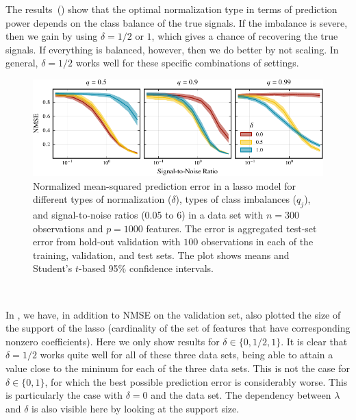 The results~() show that the optimal normalization type in terms of
prediction power depends on the class balance of the true signals. If the imbalance is
severe, then we gain by using \(\delta=1/2\) or \(1\), which gives a chance of recovering
the true signals. If everything is balanced, however, then we do better by not scaling. In
general, \(\delta=1/2\) works well for these specific combinations of settings.

\begin{figure}[htpb]
  \centering
  \includegraphics[]{plots/binary_data_sim.pdf}
  \caption{%
    Normalized mean-squared prediction error in a lasso model for different types of
    normalization (\(\delta\)), types of class imbalances (\(q_j\)), and signal-to-noise ratios
    (0.05 to 6) in a data set with \(n=300\) observations and \(p = \num{1000}\) features. The
    error is aggregated test-set error from hold-out validation with \(100\) observations in
    each of the training, validation, and test sets. The plot shows means and Student's
    \(t\)-based 95\% confidence intervals. } \label{fig:binary-sim}
\end{figure}

\

In , we have, in addition to NMSE on the validation set, also
plotted the size of the support of the lasso (cardinality of the set of features that have
corresponding nonzero coefficients). Here we only show results for \(\delta \in \{0, 1/2,
1\}\). It is clear that \(\delta = 1/2\) works quite well for all of these three data sets,
being able to attain a value close to the mininum for each of the three data sets. This is
not the case for \(\delta \in \{0, 1\}\), for which the best possible prediction error is
considerably worse. This is particularly the case with \(\delta =0\) and the 
data set. The dependency between \(\lambda\) and \(\delta\) is also visible here by looking
at the support size.

